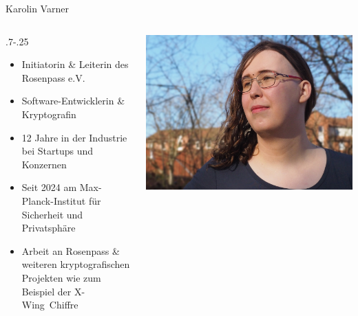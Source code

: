 \begin{frame}{Karolin Varner}
  \begin{columns}[fullwidth,c]
	\hspace*{.25\LeftSlideIndent}%
    \begin{column}{\dimexpr.7\linewidth-.25\LeftSlideIndent}
      \begin{itemize}
        \item Initiatorin \& Leiterin des Rosenpass e.V.
        \item Software-Entwicklerin \& Kryptografin
        \item 12 Jahre in der Industrie bei Startups und Konzernen
        \item Seit 2024 am Max-Planck-Institut für Sicherheit und Privatsphäre
        \item Arbeit an Rosenpass \& weiteren kryptografischen Projekten wie zum Beispiel der X-Wing~Chiffre
      \end{itemize}
    \end{column}%
    \begin{column}{.3\linewidth}
      \includegraphics[width=.92\linewidth,trim=200 0 100 0,clip]{graphics/karolin-varner.jpg}
    \end{column}
  \end{columns}
\end{frame}

